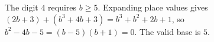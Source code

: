 The digit $4$ requires $b\ge5$. Expanding place values gives $(2b+3)+(b^3+4b+3)=b^3+b^2+2b+1$, so $b^2-4b-5=(b-5)(b+1)=0$. The valid base is $\boxed5$.
